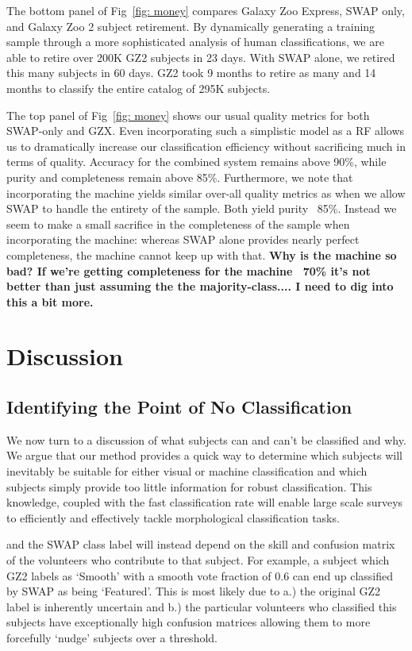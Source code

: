 \documentclass[twocolumn]{aastex6}
\begin{document}
The bottom panel of Fig~\ref{fig: money} compares  Galaxy Zoo Express, 
SWAP only, and Galaxy Zoo 2 subject retirement.
By dynamically generating a training sample
through a more sophisticated analysis of human classifications, we are able
to retire over 200K GZ2 subjects in 23 days.  With SWAP alone, we retired this
many subjects in 60 days. GZ2 took 9 months to retire as many and 14 months 
to classify the entire catalog of 295K subjects. 

The top panel of Fig~\ref{fig: money} shows our usual quality metrics for both 
SWAP-only and GZX.  Even incorporating such a simplistic model as a RF allows
us to dramatically increase our classification efficiency without sacrificing much 
in terms of quality. Accuracy for the combined system remains above 90\%, while
purity and completeness remain above 85\%. Furthermore, we note that 
incorporating the machine yields similar over-all quality metrics as when we 
allow SWAP to handle the entirety of the sample. Both yield purity ~85\%. 
Instead we seem to make a small sacrifice in the completeness of the sample
when incorporating the machine: whereas SWAP alone provides nearly perfect
completeness, the machine cannot keep up with that.
 \textbf{Why is the machine so bad? If we're getting completeness for the machine ~70\% it's not better than just assuming the the majority-class.... I need to dig into this a bit more.}



\section{Discussion}

\subsection{Identifying the Point of No Classification}

We now turn to a discussion of what subjects can and can't be classified and why. 
We argue that our method provides a quick way to determine which subjects will
inevitably be suitable for either visual or machine classification and which subjects
simply provide too little information for robust classification. This knowledge, coupled
with the fast classification rate will enable large scale surveys to efficiently and effectively
tackle morphological classification tasks. 




and the SWAP class label will instead depend on the skill and confusion matrix of the 
volunteers who contribute to that subject. For example, a subject which GZ2 labels as 
`Smooth' with a smooth vote fraction of 0.6 can end up classified by SWAP as being `Featured'. 
This is most likely due to a.) the original GZ2 label is inherently uncertain and 
b.) the particular volunteers who classified this subjects have exceptionally high 
confusion matrices allowing them to more forcefully `nudge' subjects over a threshold. 
\end{document}
